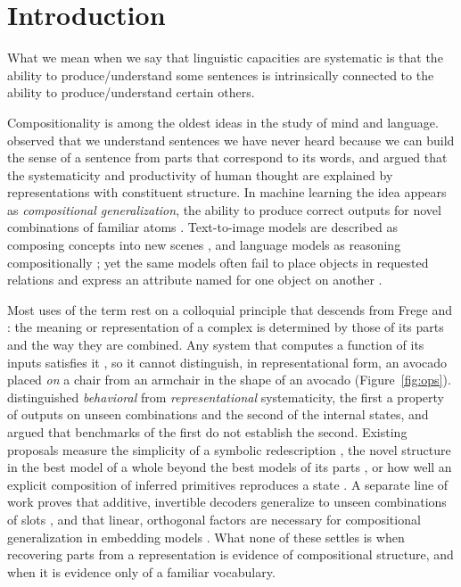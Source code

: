 \documentclass[10pt]{article}
\theoremstyle{plain}
\theoremstyle{remark}
\begin{document}
\section{Introduction}
\label{sec:intro}

\epigraph{What we mean when we say that linguistic capacities are systematic is that the ability to produce/understand some sentences is intrinsically connected to the ability to produce/understand certain others.}{\citet{fodor1988}}

Compositionality is among the oldest ideas in the study of mind and language. \citet{frege1923} observed that we understand sentences we have never heard because we can build the sense of a sentence from parts that correspond to its words, and \citet{fodor1988} argued that the systematicity and productivity of human thought are explained by representations with constituent structure. In machine learning the idea appears as \emph{compositional generalization}, the ability to produce correct outputs for novel combinations of familiar atoms \citep{lake2018,keysers2020,kim2020cogs}. Text-to-image models are described as composing concepts into new scenes \citep{ramesh2021,okawa2023}, and language models as reasoning compositionally \citep{press2023}; yet the same models often fail to place objects in requested relations \citep{conwell2022} and express an attribute named for one object on another \citep{rassin2022}.

Most uses of the term rest on a colloquial principle that descends from Frege and \citet{montague1970}: the meaning or representation of a complex is determined by those of its parts and the way they are combined. Any system that computes a function of its inputs satisfies it \citep{zadrozny1994,westerstahl1998}, so it cannot distinguish, in representational form, an avocado placed \emph{on} a chair from an armchair in the shape of an avocado (Figure~\ref{fig:ops}). \citet{vegner2025} distinguished \emph{behavioral} from \emph{representational} systematicity, the first a property of outputs on unseen combinations and the second of the internal states, and argued that benchmarks of the first do not establish the second. Existing proposals measure the simplicity of a symbolic redescription \citep{elmoznino2024}, the novel structure in the best model of a whole beyond the best models of its parts \citep{elmoznino2026}, or how well an explicit composition of inferred primitives reproduces a state \citep{andreas2019}. A separate line of work proves that additive, invertible decoders generalize to unseen combinations of slots \citep{lachapelle2023,wiedemer2024}, and that linear, orthogonal factors are necessary for compositional generalization in embedding models \citep{uselis2026}. What none of these settles is when recovering parts from a representation is evidence of compositional structure, and when it is evidence only of a familiar vocabulary.
\end{document}

